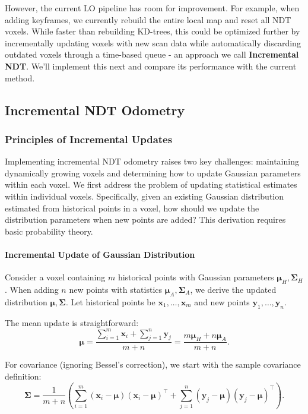 However, the current LO pipeline has room for improvement. For example, when adding keyframes, we currently rebuild the entire local map and reset all NDT voxels. While faster than rebuilding KD-trees, this could be optimized further by incrementally updating voxels with new scan data while automatically discarding outdated voxels through a time-based queue - an approach we call \textbf{Incremental NDT}. We'll implement this next and compare its performance with the current method.

\subsection{Incremental NDT Odometry}
\label{sec:inc-ndt}
\subsubsection{Principles of Incremental Updates}
Implementing incremental NDT odometry raises two key challenges: maintaining dynamically growing voxels and determining how to update Gaussian parameters within each voxel. We first address the problem of updating statistical estimates within individual voxels. Specifically, given an existing Gaussian distribution estimated from historical points in a voxel, how should we update the distribution parameters when new points are added? This derivation requires basic probability theory.

\paragraph{Incremental Update of Gaussian Distribution}
Consider a voxel containing $m$ historical points with Gaussian parameters $\boldsymbol{\mu}_H, \boldsymbol{\Sigma}_H$. When adding $n$ new points with statistics $\boldsymbol{\mu}_A, \boldsymbol{\Sigma}_A$, we derive the updated distribution $\boldsymbol{\mu}, \boldsymbol{\Sigma}$. Let historical points be $\bm{x}_1, \ldots, \bm{x}_m$ and new points $\bm{y}_1, \ldots, \bm{y}_n$.

The mean update is straightforward:
\begin{equation}\label{key}
	\boldsymbol{\mu} = \frac{\sum_{i=1}^m \bm{x}_i + \sum_{j=1}^n \bm{y}_j}{m+n} = \frac{m \boldsymbol{\mu}_H + n\boldsymbol{\mu}_A}{m+n}.
\end{equation}

For covariance (ignoring Bessel's correction), we start with the sample covariance definition:
\begin{equation}\label{eq:7.18}
	\boldsymbol{\Sigma} = \frac{1}{m+n} \left( \sum_{i=1}^{m} (\bm{x}_i - \boldsymbol{\mu})(\bm{x}_i - \boldsymbol{\mu})^\top + \sum_{j=1}^{n} (\bm{y}_j - \boldsymbol{\mu})(\bm{y}_j - \boldsymbol{\mu})^\top \right).
\end{equation}

